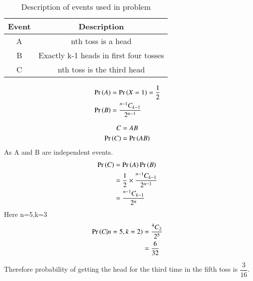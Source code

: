 \documentclass[journal,12pt,twocolumn]{IEEEtran}
\begin{document}
\begin{table}[h]
\begin{tabular}{|c|c|}
\hline
\textbf{Event} & \textbf{Description}                 \\ \hline
A              & nth toss is a head                   \\ \hline
B              & Exactly k-1 heads in first four tosses \\ \hline
C              & nth toss is the third head           \\ \hline
\end{tabular}
\caption{Description of events used in problem}
\label{tab:Events}
\end{table}

\begin{align}
\Pr\left(A\right)&=\Pr\left(X=1\right)=\dfrac{1}{2}\\
\Pr\left(B\right)&=\dfrac{{}^{n-1}C_{k-1}}{2^{n-1}}
\end{align}

\begin{align}
    C&=AB\\
    \Pr\left(C\right)&=\Pr\left(AB\right)
\end{align}
As A and B are independent events.
\begin{align}
    \Pr\left(C\right)&=\Pr\left(A\right)\Pr\left(B\right)\\
    &=\dfrac{1}{2}\times\dfrac{{}^{n-1}C_{k-1}}{2^{n-1}}\\
    &=\dfrac{{}^{n-1}C_{k-1}}{2^n}
\end{align}
Here n=5,k=3
\begin{align}
    \Pr\left(C|n=5,k=2\right)&=\dfrac{{}^{4}C_{2}}{2^{5}}\\
    &=\dfrac{6}{32}
\end{align}

Therefore probability of getting the head for the third time in the fifth toss is $\dfrac{3}{16}$. 
\end{document}
